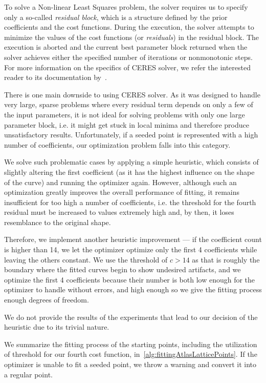 To solve a Non-linear Least Squares problem, the solver requires us to specify only a so-called \emph{residual block}, which is a structure defined by the prior coefficients and the cost functions. During the execution, the solver attempts to minimize the values of the cost functions (or \emph{residuals}) in the residual block. The execution is aborted and the current best parameter block returned when the solver achieves either the specified number of iterations or nonmonotonic steps. For more information on the specifics of CERES solver, we refer the interested reader to its documentation by~\citet{ceresNonLinearLeastSquares}.

There is one main downside to using CERES solver. As it was designed to handle very large, sparse problems where every residual term depends on only a few of the input parameters, it is not ideal for solving problems with only one large parameter block, i.e. it might get stuck in local minima and therefore produce unsatisfactory results. Unfortunately, if a seeded point is represented with a high number of coefficients, our optimization problem falls into this category.

We solve such problematic cases by applying a simple heuristic, which consists of slightly altering the first coefficient (as it has the highest influence on the shape of the curve) and running the optimizer again. However, although such an optimization greatly improves the overall performance of fitting, it remains insufficient for too high a number of coefficients, i.e. the threshold for the fourth residual must be increased to values extremely high and, by then, it loses resemblance to the original shape.

Therefore, we implement another heuristic improvement --- if the coefficient count is higher than 14, we let the optimizer optimize only the first 4 coefficients while leaving the others constant. We use the threshold of $c > 14$ as that is roughly the boundary where the fitted curves begin to show undesired artifacts, and we optimize the first 4 coefficients because their number is both low enough for the optimizer to handle without errors, and high enough so we give the fitting process enough degrees of freedom.

We do not provide the results of the experiments that lead to our decision of the heuristic due to its trivial nature.

We summarize the fitting process of the starting points, including the utilization of threshold for our fourth cost function, in~\cref{alg:fittingAtlasLatticePoints}. If the optimizer is unable to fit a seeded point, we throw a warning and convert it into a regular point.

